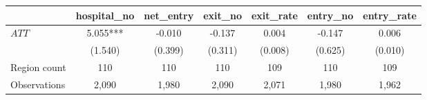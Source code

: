 
\begin{tabular}{lcccccc}
\toprule
 & hospital\_no & net\_entry & exit\_no & exit\_rate & entry\_no & entry\_rate\\
\midrule
$ATT$ & 5.055*** & -0.010 & -0.137 & 0.004 & -0.147 & 0.006\\
 & (1.540) & (0.399) & (0.311) & (0.008) & (0.625) & (0.010)\\
\midrule
Region count & 110 & 110 & 110 & 109 & 110 & 109\\
Observations & 2,090 & 1,980 & 2,090 & 2,071 & 1,980 & 1,962\\
\bottomrule
\end{tabular}
